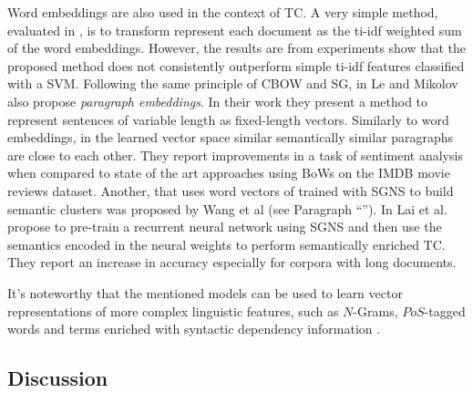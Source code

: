Word embeddings are also used in the context of TC. A very simple method,
evaluated in \cite{JosephLilleberge2015}, is to transform represent each
document as the ti-idf weighted sum of the word embeddings. However, the results
are from experiments show that the proposed method does not consistently 
outperform simple ti-idf features classified with a SVM.  
Following the same principle of CBOW and SG, in \cite{le2014distributed}
Le and Mikolov also propose \emph{paragraph embeddings}. In their work they
present a method to represent sentences of variable length as fixed-length vectors. 
Similarly to word embeddings, in the learned vector space similar
semantically similar paragraphs are close to each other.
They report improvements in a task of sentiment analysis when compared to state
of the art approaches using BoWs on the IMDB movie reviews dataset. Another,
that uses word vectors of trained with SGNS to build semantic clusters was
proposed by Wang et al \cite{wang2016semantic} (see Paragraph
``''). In \cite{Lai2015} Lai et al. propose to
pre-train a recurrent neural network using SGNS and then use the semantics
encoded in the neural weights to perform semantically enriched TC. They report
an increase in accuracy especially for corpora with long documents.

It's noteworthy that the mentioned models can be used to learn
vector representations of more complex linguistic features, such as $N$-Grams,
$PoS$-tagged words and terms enriched with syntactic dependency information
\cite{Levy2014, Rothenhausler2009, Komninos2016}.

\subsection{Discussion}

